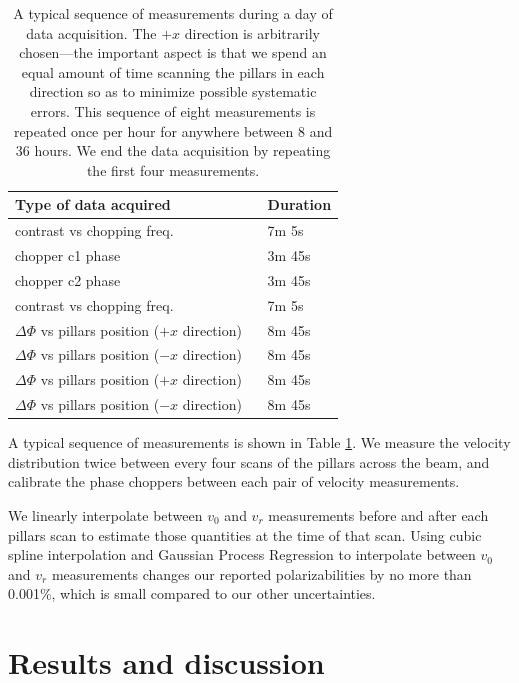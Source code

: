 \documentclass[twocolumn,pra,showpacs,superscriptaddress,longbibliography]{revtex4-1}   %
\newcommand{\sspace}{$\enspace$}
\begin{document}
\begingroup
\begin{table}
\caption{\label{schedule}A typical sequence of measurements during a day of data acquisition. The $+x$ direction is arbitrarily chosen---the important aspect is that we spend an equal amount of time scanning the pillars in each direction so as to minimize possible systematic errors. This sequence of eight measurements is repeated once per hour for anywhere between 8 and 36 hours. We end the data acquisition by repeating the first four measurements.}
\begin{center}
\begin{tabular}{l l}
\hline
\hline
Type of data acquired & Duration \\
\hline
contrast vs chopping freq. & 7m 5s \\
chopper c1 phase & 3m 45s \\
chopper c2 phase & 3m 45s\\
contrast vs chopping freq. & 7m 5s \\
$\Delta\Phi$ vs pillars position ($+x$ direction) \sspace & 8m 45s \\
$\Delta\Phi$ vs pillars position ($-x$ direction) & 8m 45s \\
$\Delta\Phi$ vs pillars position ($+x$ direction) & 8m 45s \\
$\Delta\Phi$ vs pillars position ($-x$ direction) & 8m 45s \\
\hline
\hline
\end{tabular}
\end{center}
\end{table}
\endgroup

A typical sequence of measurements is shown in Table \ref{schedule}.
We measure the velocity distribution twice between every four scans of the pillars across the beam, and calibrate the phase choppers between each pair of velocity measurements.

We linearly interpolate between $v_0$ and $v_r$ measurements before and after each pillars scan to estimate those quantities at the time of that scan.
Using cubic spline interpolation and Gaussian Process Regression to interpolate between $v_0$ and $v_r$ measurements changes our reported polarizabilities by no more than 0.001\%, which is small compared to our other uncertainties.

\section{Results and discussion} \label{sectionResults}
\end{document}
